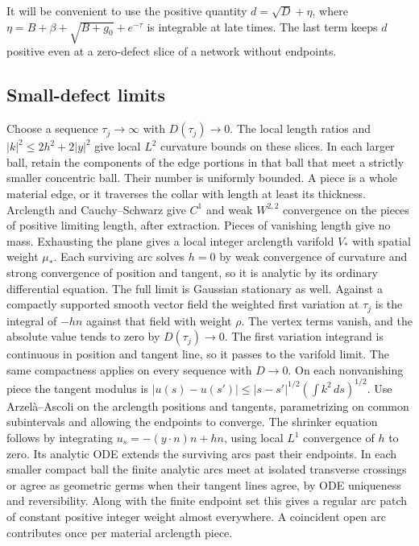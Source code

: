 It will be convenient to use the positive quantity \(d=\sqrt D+\eta\), where \(\eta=B+\beta+\sqrt{B+g_0}+e^{-\tau}\) is integrable at late times. The last term keeps \(d\) positive even at a zero-defect slice of a network without endpoints.

\subsection{Small-defect limits}\label{sec:compactness}

Choose a sequence \(\tau_j\to\infty\) with \(D(\tau_j)\to0\). The local length ratios and \(|k|^2\le 2h^2+2|y|^2\) give local \(L^2\) curvature bounds on these slices. In each larger ball, retain the components of the edge portions in that ball that meet a strictly smaller concentric ball. Their number is uniformly bounded. A piece is a whole material edge, or it traverses the collar with length at least its thickness. Arclength and Cauchy--Schwarz give \(C^1\) and weak \(W^{2,2}\) convergence on the pieces of positive limiting length, after extraction. Pieces of vanishing length give no mass. Exhausting the plane gives a local integer arclength varifold \(V_*\) with spatial weight \(\mu_*\). Each surviving arc solves \(h=0\) by weak convergence of curvature and strong convergence of position and tangent, so it is analytic by its ordinary differential equation. The full limit is Gaussian stationary as well. Against a compactly supported smooth vector field the weighted first variation at \(\tau_j\) is the integral of \(-h n\) against that field with weight \(\rho\). The vertex terms vanish, and the absolute value tends to zero by \(D(\tau_j)\to0\). The first variation integrand is continuous in position and tangent line, so it passes to the varifold limit. The same compactness applies on every sequence with \(D\to0\). On each nonvanishing piece the tangent modulus is \(|u(s)-u(s')|\le |s-s'|^{1/2}(\int k^2\,ds)^{1/2}\). Use Arzelà--Ascoli on the arclength positions and tangents, parametrizing on common subintervals and allowing the endpoints to converge. The shrinker equation follows by integrating \(u_s=-(y\cdot n)n+hn\), using local \(L^1\) convergence of \(h\) to zero. Its analytic ODE extends the surviving arcs past their endpoints. In each smaller compact ball the finite analytic arcs meet at isolated transverse crossings or agree as geometric germs when their tangent lines agree, by ODE uniqueness and reversibility. Along with the finite endpoint set this gives a regular arc patch of constant positive integer weight almost everywhere. A coincident open arc contributes once per material arclength piece.

